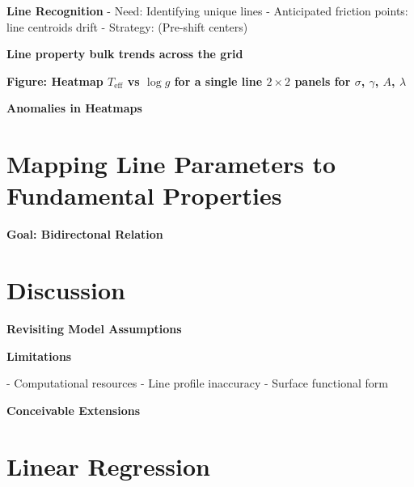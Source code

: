 \documentclass[twocolumn]{aastex631}
\begin{document}
\begin{mdframed}
    \textbf{Line Recognition}
    - Need: Identifying unique lines
    - Anticipated friction points: line centroids drift
    - Strategy: (Pre-shift centers)
    \textcolor{lightgray}{\blindtext}
\end{mdframed}

\begin{mdframed}
    \textbf{Line property bulk trends across the grid}
    \textcolor{lightgray}{\blindtext}
\end{mdframed}

\begin{mdframed}
    \textbf{Figure: Heatmap $T_\mathrm{eff}$ vs $\log{g}$ for a single line $2\times2$ panels for $\sigma$, $\gamma$, $A$, $\lambda$ }
\end{mdframed}

\begin{mdframed}
    \textbf{Anomalies in Heatmaps}
    \textcolor{lightgray}{\blindtext}
\end{mdframed}

\section{Mapping Line Parameters to Fundamental Properties}
\begin{mdframed}
    \textbf{Goal: Bidirectonal Relation}

    \textcolor{lightgray}{\blindtext}
\end{mdframed}


\section{Discussion}
\begin{mdframed}
    \textbf{Revisiting Model Assumptions}

    \textcolor{lightgray}{\blindtext}
\end{mdframed}

\begin{mdframed}
    \textbf{Limitations}

    - Computational resources
    - Line profile inaccuracy
    - Surface functional form

    \textcolor{lightgray}{\blindtext}
\end{mdframed}


\begin{mdframed}
    \textbf{Conceivable Extensions}

    \textcolor{lightgray}{\blindtext}
\end{mdframed}


\pagebreak
\newpage

\begin{acknowledgments}
    \blindtext
\end{acknowledgments}


\software{}


\clearpage

\appendix
\section{Linear Regression}
\blindtext
\end{document}
